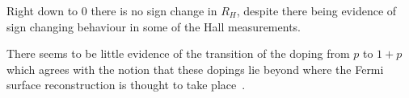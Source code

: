 Right down to \unit{0}{\kelvin} there is no sign change in $R_H$, despite there being evidence of sign changing behaviour in some of the Hall measurements. 

There seems to be little evidence of the transition of the doping from $p$ to $1+p$ which agrees with the notion that these dopings lie beyond where the Fermi surface reconstruction is thought to take place~\cite{LeBoeuf2007}. 




